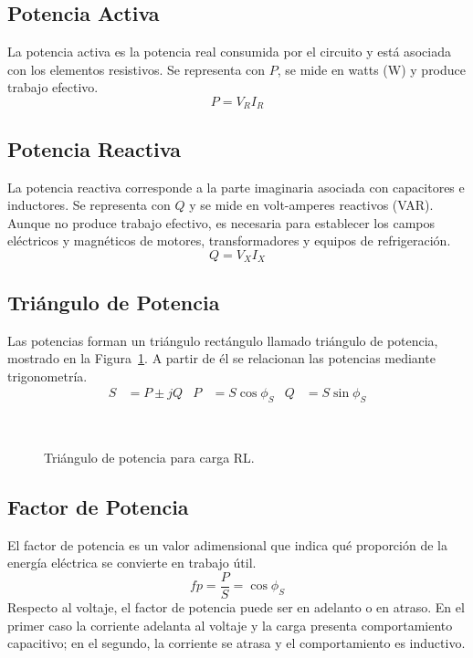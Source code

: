 \documentclass[12pt,a4paper]{article}
\begin{document}
\subsection{Potencia Activa}
La potencia activa es la potencia real consumida por el circuito y está asociada con los elementos resistivos. Se representa con $P$, se mide en watts (W) y produce trabajo efectivo.
\begin{equation}
    P = V_R I_R
\end{equation}

\subsection{Potencia Reactiva}
La potencia reactiva corresponde a la parte imaginaria asociada con capacitores e inductores. Se representa con $Q$ y se mide en volt-amperes reactivos (VAR). Aunque no produce trabajo efectivo, es necesaria para establecer los campos eléctricos y magnéticos de motores, transformadores y equipos de refrigeración.
\begin{equation}
    Q = V_X I_X
\end{equation}

\subsection{Triángulo de Potencia}
Las potencias forman un triángulo rectángulo llamado triángulo de potencia, mostrado en la Figura~\ref{fig:p5-triangulo}. A partir de él se relacionan las potencias mediante trigonometría.
\begin{align}
    S &= P \pm jQ & P &= S\cos\phi_S & Q &= S\sin\phi_S
\end{align}
\begin{figure}[H]
    \centering
    \caption{Triángulo de potencia para carga RL.}~\label{fig:p5-triangulo}
\end{figure}

\subsection{Factor de Potencia}
El factor de potencia es un valor adimensional que indica qué proporción de la energía eléctrica se convierte en trabajo útil.
\begin{equation}
    fp = \frac{P}{S} = \cos\phi_S
\end{equation}
Respecto al voltaje, el factor de potencia puede ser en adelanto o en atraso. En el primer caso la corriente adelanta al voltaje y la carga presenta comportamiento capacitivo; en el segundo, la corriente se atrasa y el comportamiento es inductivo.
\end{document}
